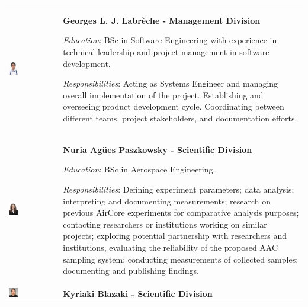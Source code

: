 

\begin{longtable}[]{m{} m{}}

 \includegraphics[width=0.2\textwidth]{1-introduction/img/georges-louis-joseph-labreche.jpg}  & \textbf{Georges L. J. Labrèche - Management Division}

\smallskip
\textit{Education}: BSc in Software Engineering with experience in technical leadership and project management in software development.

\smallskip
\textit{Responsibilities}: Acting as Systems Engineer and managing overall implementation of the project. Establishing and overseeing product development cycle. Coordinating between different teams, project stakeholders, and documentation efforts.                          
\bigskip
\\

\includegraphics[width=0.2\textwidth]{1-introduction/img/agues-paszkowsky.jpg} & \textbf{Nuria Agües Paszkowsky - Scientific Division}

\smallskip
\textit{Education}: BSc in Aerospace Engineering.

\smallskip
\textit{Responsibilities}: Defining experiment parameters; data analysis; interpreting and documenting measurements; research on previous AirCore experiments for comparative analysis purposes; contacting researchers or institutions working on similar projects; exploring potential partnership with researchers and institutions, evaluating the reliability of the proposed AAC sampling system; conducting measurements of collected samples; documenting and publishing findings. 
\bigskip
\\

\includegraphics[width=0.2\textwidth]{1-introduction/img/kiki-blazaki.png} & \textbf{Kyriaki Blazaki - Scientific Division}


\end{longtable}
